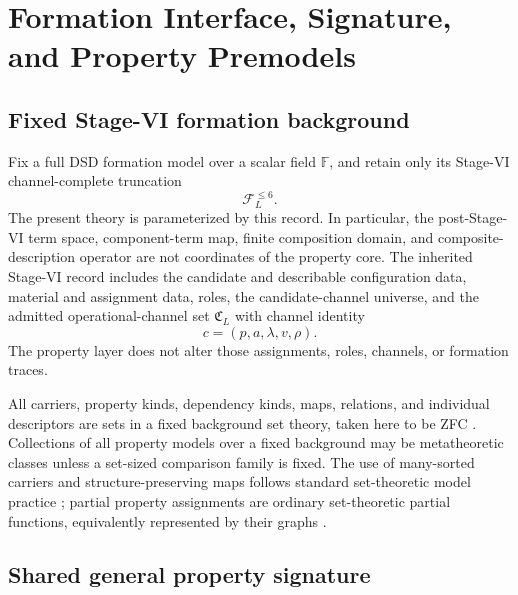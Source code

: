 \documentclass[11pt]{article}
\newcommand{\FVI}{\mathcal F_{L}^{\le 6}}
\theoremstyle{definition}
\theoremstyle{remark}
\begin{document}
\section{Formation Interface, Signature, and Property Premodels}
\label{sec:formal-setting}

\subsection{Fixed Stage-VI formation background}

Fix a full DSD formation model over a scalar field \(\mathbb F\), and retain only its Stage-VI channel-complete truncation
\[
\FVI.
\]
The present theory is parameterized by this record.
In particular, the post-Stage-VI term space, component-term map, finite composition domain, and composite-description operator are not coordinates of the property core.
The inherited Stage-VI record includes the candidate and describable configuration data, material and assignment data, roles, the candidate-channel universe, and the admitted operational-channel set \(\mathfrak C_L\) with channel identity
\[
c=(p,a,\lambda,v,\rho).
\]
The property layer does not alter those assignments, roles, channels, or formation traces.

All carriers, property kinds, dependency kinds, maps, relations, and individual descriptors are sets in a fixed background set theory, taken here to be ZFC \cite{JechSetTheory}.
Collections of all property models over a fixed background may be metatheoretic classes unless a set-sized comparison family is fixed.
The use of many-sorted carriers and structure-preserving maps follows standard set-theoretic model practice \cite{HodgesModelTheory}; partial property assignments are ordinary set-theoretic partial functions, equivalently represented by their graphs \cite{FarmerPartial}.

\subsection{Shared general property signature}
\end{document}
